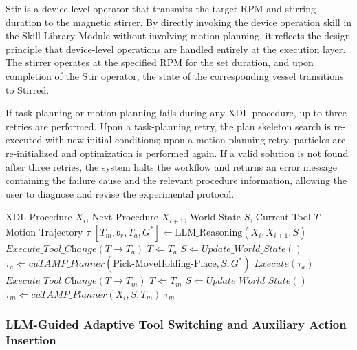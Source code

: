 \documentclass{ieeeaccess}
\begin{document}
Stir is a device-level operator that transmits the target RPM and stirring duration to the magnetic stirrer. By directly invoking the device operation skill in the Skill Library Module without involving motion planning, it reflects the design principle that device-level operations are handled entirely at the execution layer. The stirrer operates at the specified RPM for the set duration, and upon completion of the Stir operator, the state of the corresponding vessel transitions to Stirred.

If task planning or motion planning fails during any XDL procedure, up to three retries are performed. Upon a task-planning retry, the plan skeleton search is re-executed with new initial conditions; upon a motion-planning retry, particles are re-initialized and optimization is performed again. If a valid solution is not found after three retries, the system halts the workflow and returns an error message containing the failure cause and the relevant procedure information, allowing the user to diagnose and revise the experimental protocol.


\begin{algorithm}[t]
\caption{LLM-Guided Adaptive TAMP with Tool Switching}\label{algo:tamp}
\footnotesize
\begin{algorithmic}[1]
\REQUIRE XDL Procedure $X_i$, Next Procedure $X_{i+1}$, World State $S$, Current Tool $T$
\ENSURE Motion Trajectory $\tau$
\STATE $[T_m, b_r, T_a, G^*] \Leftarrow \text{LLM\_Reasoning}(X_i, X_{i+1}, S)$
 
        \STATE $\textit{Execute\_Tool\_Change}(T \rightarrow T_a)$
        \STATE $T \Leftarrow T_a$
    \ENDIF
    \STATE $S \Leftarrow \textit{Update\_World\_State}()$ 
    \STATE $\tau_a \Leftarrow \textit{cuTAMP\_Planner}(\text{Pick-MoveHolding-Place}, S, G^*)$
    \STATE $\textit{Execute}(\tau_a)$
\ENDIF
{} 
    \STATE $\textit{Execute\_Tool\_Change}(T \rightarrow T_m)$
    \STATE $T \Leftarrow T_m$
\ENDIF
\STATE $S \Leftarrow \textit{Update\_World\_State}()$ 
\STATE $\tau_m \Leftarrow \textit{cuTAMP\_Planner}(X_i, S, T_m)$
\RETURN $\tau_m$
\end{algorithmic}
\end{algorithm}


\subsubsection{LLM-Guided Adaptive Tool Switching and Auxiliary Action Insertion}\label{sec:3.4.2}
\end{document}
